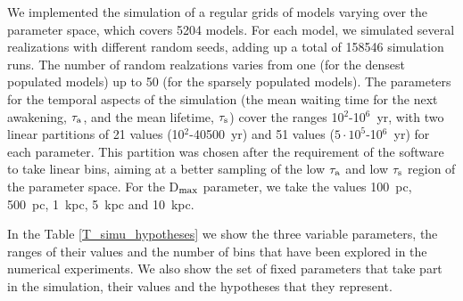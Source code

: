 \documentclass[crop]{CSLB}
\newcommand{\ttn}[1]{}
\begin{document}
We implemented the simulation of a regular grids of models varying over
the parameter space, which covers 5204 models.
%
For each model, we simulated several realizations with different random
seeds, adding up a total of 
158546 simulation runs.
%
The number of random realzations varies from one (for the densest populated models)
up to 50 (for the sparsely populated models).
%
The parameters for the temporal aspects of the simulation (the mean
waiting time for the next awakening, $\tau_{\rm a}$, and the
mean lifetime, $\tau_{\rm s}$) cover the ranges
10$^2$-10$^6$~yr, with 
two linear partitions of 21 values (10$^2$-40500~yr) and 51 values
($5\cdot10^5$-10$^6$~yr)
for each parameter.
%
This partition was chosen after the requirement of the software to take linear bins, 
aiming at a better sampling of the low $\tau_{\rm a}$ and low
$\tau_{\rm s}$ region of the parameter space.
%
For the D$_{\rm max}$ parameter, we take the 
values 100~pc, 500~pc, 1~kpc, 5~kpc and 10~kpc.
%
\ttn{1}
%
In the Table \ref{T_simu_hypotheses} we show the three variable
parameters, the ranges of their values and the number of bins that
have been explored in the numerical experiments.
%
We also show the set of fixed parameters that take part in the simulation,
their values and the hypotheses that they represent.
\end{document}
